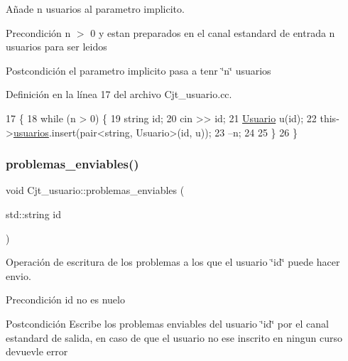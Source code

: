 Añade n usuarios al parametro implicito. 

\begin{DoxyPrecond}{Precondición}
n $>$ 0 y estan preparados en el canal estandard de entrada n usuarios para ser leidos 
\end{DoxyPrecond}
\begin{DoxyPostcond}{Postcondición}
el parametro implicito pasa a tenr \char`\"{}n\char`\"{} usuarios 
\end{DoxyPostcond}


Definición en la línea 17 del archivo Cjt\+\_\+usuario.\+cc.


\begin{DoxyCode}
17                                      \{
18     \textcolor{keywordflow}{while} (n > 0) \{
19         \textcolor{keywordtype}{string} id;
20         cin >> id;
21         \mbox{\hyperlink{class_usuario}{Usuario}} u(\textcolor{keywordtype}{id});
22         this->\mbox{\hyperlink{class_cjt__usuario_af814d06f1c52bc2e744d253d20ce6e6b}{usuarios}}.insert(pair<string, Usuario>(\textcolor{keywordtype}{id}, u));
23         --n;
24 
25     \}
26 \}
\end{DoxyCode}
\mbox{\label{class_cjt__usuario_adf8f61c7eacd7328896c168adb3e63cd}} 
\subsubsection{\texorpdfstring{problemas\+\_\+enviables()}{problemas\_enviables()}}
{\footnotesize\ttfamily void Cjt\+\_\+usuario\+::problemas\+\_\+enviables (\begin{DoxyParamCaption}\item[{std\+::string}]{id }\end{DoxyParamCaption})}



Operación de escritura de los problemas a los que el usuario \char`\"{}id\char`\"{} puede hacer envio. 

\begin{DoxyPrecond}{Precondición}
id no es nuelo 
\end{DoxyPrecond}
\begin{DoxyPostcond}{Postcondición}
Escribe los problemas enviables del usuario \char`\"{}id\char`\"{} por el canal estandard de salida, en caso de que el usuario no ese inscrito en ningun curso devuevle error 
\end{DoxyPostcond}


